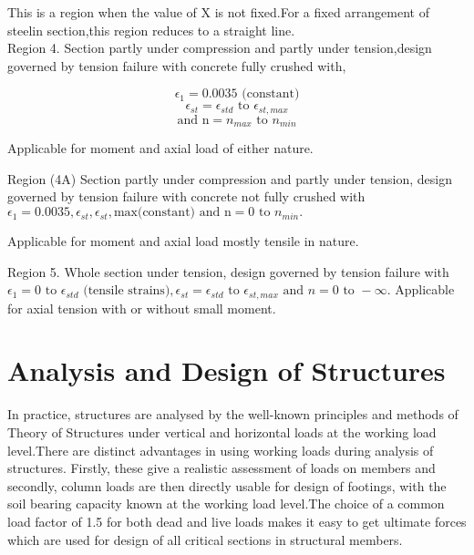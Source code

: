 This is a region when the value of X is not ﬁxed.For a ﬁxed arrangement
of steelin section,this region reduces to a straight line. \\

Region 4. Section partly under compression and partly under tension,design
governed by tension failure with concrete fully crushed with,

$$\epsilon_1 = 0.0035 \text{ (constant)}$$
$$\epsilon_{st} = \epsilon_{std} \text{ to } \epsilon_{st,max}$$
$$\text{and n} = n_{max} \text{ to } n_{min}$$

Applicable for moment and axial load of either nature.

Region (4A) Section partly under compression and partly under tension,
design governed by tension failure with concrete not fully crushed with
$\epsilon_1 = 0.0035,\epsilon_{st},\epsilon_{st},
\text{max(constant) and n} = 0 \text{ to } n_{min}.$

Applicable for moment and axial load mostly tensile in nature.

Region 5. Whole section under tension, design governed by tension failure with 
$\epsilon_1 = 0 \text{ to }\epsilon_{std} \text{ (tensile strains)},
\epsilon_{st}=\epsilon_{std} \text{ to } \epsilon_{st,max} \text{ and } n =
0 \text{ to } -\infty.$
Applicable for axial tension with or without small moment.

\section{Analysis and Design of Structures}

In practice, structures are analysed by the well-known principles and
methods of Theory of Structures under vertical and horizontal loads at the
working load level.There are distinct advantages in using working loads
during analysis of structures. Firstly, these give a realistic assessment
of loads on members and secondly, column loads are then directly usable
for design of footings, with the soil bearing capacity known at the working
load level.The choice of a common load factor of 1.5 for both dead and
live loads makes it easy to get ultimate forces which are used for
design of all critical sections in structural members.


